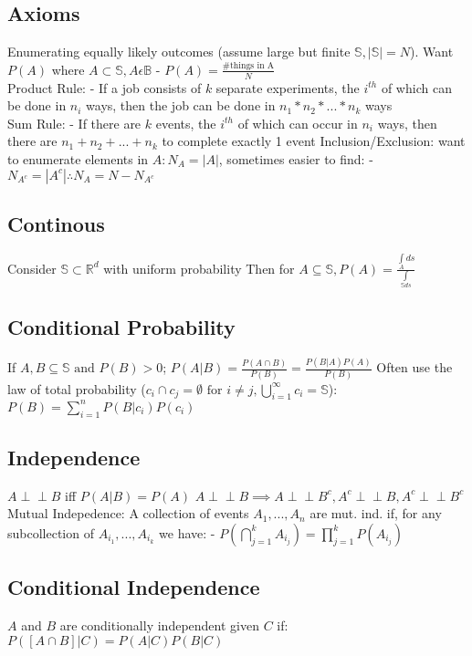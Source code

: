 \documentclass[twocolumn]{article}
\newcommand{\indep}{\perp\!\!\!\!\perp} %
\let\Oldint=\int
\let\Oldsum=\sum
\let\Oldprod=\prod
\let\Oldbigcup=\bigcup
\let\Oldbigcap=\bigcap
\renewcommand{\int}{\Oldint\limits}
\renewcommand{\sum}{\Oldsum\limits}
\renewcommand{\prod}{\Oldprod\limits}
\renewcommand{\bigcup}{\Oldbigcup\limits}
\renewcommand{\bigcap}{\Oldbigcap\limits}
\begin{document}
\subsection*{Axioms}
Enumerating equally likely outcomes (assume large but finite $\mathbb{S}, |\mathbb{S}| = N$). Want $P(A)$ where $A \subset \mathbb{S}, A \epsilon \mathbb{B}$
- $P(A) = \frac{\text{\# things in A}}{N}$\\

Product Rule:
- If a job consists of $k$ separate experiments, the $i^{th}$ of which can be done in $n_i$ ways, then the job can be done in $n_1 * n_2 * ... * n_k$ ways\\

Sum Rule: 
- If there are $k$ events, the $i^{th}$ of which can occur in $n_i$ ways, then there are $n_1+n_2+ ... +n_k$ to complete exactly 1 event
Inclusion/Exclusion: want to enumerate elements in $A: N_A = |A|$, sometimes easier to find:
- $N_{A^c} = |A^c| \therefore N_A = N - N_{A^c}$

\subsection*{Continous}
Consider $\mathbb{S} \subset \mathbb{R}^d$ with uniform probability
Then for $A \subseteq \mathbb{S}, P(A) = \frac{\int_{A}ds}{\int_{\mathbb{S}ds}}$

\subsection*{Conditional Probability}
If $A, B \subseteq \mathbb{S} \text{ and } P(B) > 0$; 
$P(A|B) = \frac{P(A \cap B)}{P(B)} = \frac{P(B|A)P(A)}{P(B)}$
Often use the law of total probability ($c_i \cap c_j = \emptyset \text{ for } i \ne j, \bigcup_{i=1}^{\infty}c_i = \mathbb{S}$):
$P(B) = \sum_{i=1}^{n}P(B|c_i)P(c_i)$

\subsection*{Independence}
$A \indep B$ iff $P(A|B) = P(A)$
$A \indep B \implies A \indep B^c, A^c \indep B, A^c \indep B^c$
Mutual Indepedence:
A collection of events $A_1, ..., A_n$ are mut. ind. if, for any subcollection of $A_{i_1}, ..., A_{i_k}$ we have:
- $P(\bigcap_{j=1}^{k}A_{i_j}) = \prod_{j=1}^{k} P(A_{i_j})$

\subsection*{Conditional Independence}
$A$ and $B$ are conditionally independent given $C$ if:
$P([A \cap B]|C) = P(A|C)P(B|C)$
\end{document}
